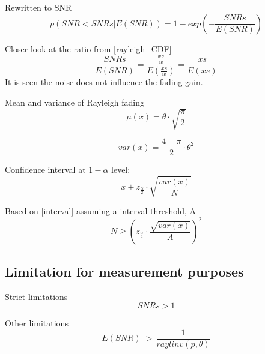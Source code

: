 Rewritten to SNR
\begin{equation}\label{rayleigh_CDF}
p(SNR < SNRs | E\left(SNR\right)) = 1-exp\left(-\frac{SNRs}{E\left(SNR\right)}\right)
\end{equation}

Closer look at the ratio from \autoref{rayleigh_CDF}
\begin{equation}
\frac{SNRs}{E\left(SNR\right)} = \frac{\frac{xs}{w}}{E\left(\frac{xs}{w}\right)} = \frac{xs}{E\left(xs\right)} 
\end{equation}
It is seen the noise does not influence the fading gain. %

Mean and variance of Rayleigh fading
\begin{equation}
\mu(x) = \theta\cdot\sqrt{\frac{\pi}{2}}
\end{equation}

\begin{equation}\label{rayleigh_var}
var(x) = \frac{4-\pi}{2}\cdot \theta^2
\end{equation}


Confidence interval at $1-\alpha$ level:
\begin{equation}\label{interval}
\bar{x} \pm z_{\frac{\alpha}{2}} \cdot \sqrt{\frac{var(x)}{N}}
\end{equation}

Based on \autoref{interval} assuming a interval threshold, A
\begin{equation}\label{interval2}
N \geq \left(z_{\frac{\alpha}{2}} \cdot \frac{\sqrt{var(x)}}{A} \right)^2
\end{equation}



\subsection{Limitation for measurement purposes}

Strict limitations
\begin{equation}
SNRs > 1
\end{equation}

Other limitations
\begin{equation}
E\left(SNR\right) \;>\, \frac{1}{raylinv(p,\theta)} 
\end{equation}

\begin{where}
\end{where}




